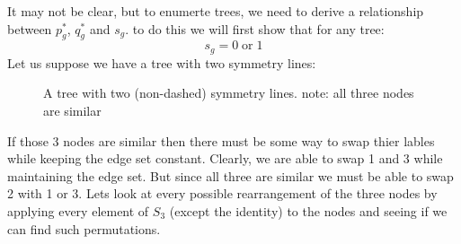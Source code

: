 \documentclass{article}
\begin{document}
It may not be clear, but to enumerte trees, we need to derive a relationship between \(p_g^*\), \(q_g^*\) and \(s_g\). to do this we will first show that for any tree:
\begin{equation}
s_g=0 \; \text{or}  \;1
\end{equation}
Let us suppose we have a tree with two symmetry lines:
\begin{figure}[!h]
\centering
{}
\caption{A tree with two (non-dashed) symmetry lines. note: all three nodes are similar }
\end{figure}
If those 3 nodes are similar then there must be some way to swap thier lables while keeping the edge set constant. Clearly, we are able to swap 1 and 3 while maintaining the edge set. But since all three are similar we must be able to swap 2 with 1 or 3. Lets look at every possible rearrangement of the three nodes by applying every element of \(S_3\) (except the identity) to the nodes and seeing if we can find such permutations. 
\end{document}
